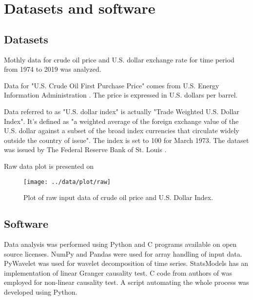 \section{Datasets and software} \label{sec:data}

\subsection{Datasets}

Mothly data for crude oil price and U.S. dollar exchange rate for time period from 1974 to 2019 was analyzed.

Data for "U.S. Crude Oil First Purchase Price" comes from U.S. Energy Information Administration \cite{crude-oil-data}. The price is expressed in U.S. dollars per barrel.

Data referred to as "U.S. dollar index" is actually "Trade Weighted U.S. Dollar Index".
It's defined as "a weighted average of the foreign exchange value of the U.S. dollar against a subset of the broad index currencies that circulate widely outside the country of issue".
The index is set to 100 for March 1973.
The dataset was issued by The Federal Reserve Bank of St. Louis \cite{usd-data}.

Raw data plot is presented on 

\begin{figure}[h]
	\texttt{[image: ../data/plot/raw]}
	\caption{Plot of raw input data of crude oil price and U.S. Dollar Index.}
	\label{fig:raw-data}
\end{figure}


\subsection{Software}
Data analysis was performed using Python and C programs available on open source licenses.
NumPy \cite{numpy} and Pandas \cite{reback2020pandas} were used for array handling of input data.
PyWavelet \cite{pywavelet} was used for wavelet decomposition of time series.
StatsModels \cite{statsmodels} has an implementation of linear Granger causality test.
C code from authors of \cite{diks-panchenko2004} was employed for non-linear causality test.
A script automating the whole process was developed using Python.
